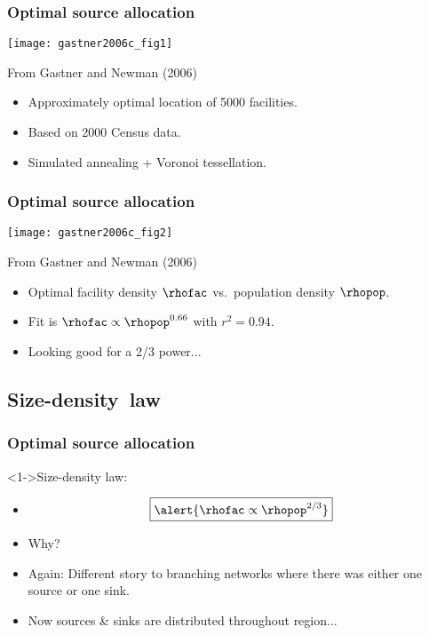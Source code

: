 \begin{frame}
  \frametitle{Optimal source allocation}

  {\centering
    \texttt{[image: gastner2006c\_fig1]}
  }

  {\small 
    From Gastner and Newman (2006)\cite{gastner2006c}\\
    \begin{itemize}
    \item<1-> Approximately optimal location of 5000 facilities.
    \item<1-> Based on 2000 Census data.
    \item<1-> Simulated annealing + Voronoi tessellation.
    \end{itemize}
  }

\end{frame}

\begin{frame}
  \frametitle{Optimal source allocation}

  \begin{center}
    \texttt{[image: gastner2006c\_fig2]}
  \end{center}
  {\small
    From Gastner and Newman (2006)\cite{gastner2006c}
  }
  \begin{itemize}
  \item<1-> Optimal facility density $\rhofac$ vs.\ population density $\rhopop$.
  \item<2-> Fit is $\rhofac \propto \rhopop^{0.66}$ with $r^2 = 0.94$.
  \item<3-> Looking good for a 2/3 power...
  \end{itemize}
  
\end{frame}


\subsection{Size-density\ law}

\begin{frame}
  \frametitle{Optimal source allocation}

  \begin{block}<1->{Size-density law:}
    \begin{itemize}
    \item<1->
    $$
    \boxed{\alert{\rhofac \propto \rhopop^{2/3}}}
    $$
    \item<2->
      Why?
    \item<3->
      Again: Different story to branching networks where
      there was either one source or one sink.
    \item<4->
      Now sources \& sinks are distributed 
      throughout region...
    \end{itemize}
  \end{block}

\end{frame}

